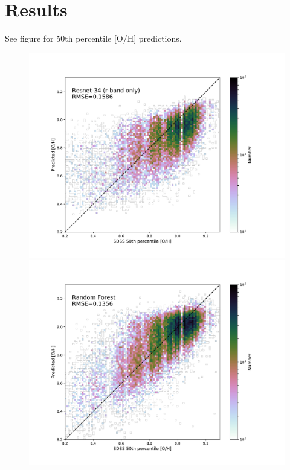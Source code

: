 \documentclass[fleqn,usenatbib]{mnras}
\begin{document}
\section{Results}\label{sec:results}

See figure for 50th percentile [O/H] predictions.



\begin{figure}
	\includegraphics[width=\columnwidth]{r-band_pred-vs-SDSS.pdf}
	\includegraphics[width=\columnwidth]{random-forest_pred-vs-SDSS.pdf}

\end{figure}
\end{document}
